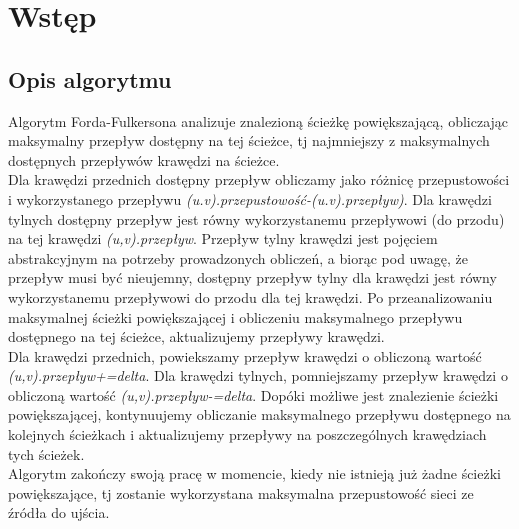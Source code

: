 \documentclass[10pt]{minutes}
\begin{document}
\MakeMinutesMeta


\section{Wstęp} %
  \subsection{Opis algorytmu}
    Algorytm Forda-Fulkersona analizuje znalezioną ścieżkę powiększającą, obliczając maksymalny przepływ dostępny na tej ścieżce, tj najmniejszy z maksymalnych dostępnych przepływów krawędzi na ścieżce.\\
    Dla krawędzi przednich dostępny przepływ obliczamy jako różnicę przepustowości i wykorzystanego przepływu \emph{(u.v).przepustowość-(u.v).przepływ)}. Dla krawędzi tylnych dostępny przepływ jest równy wykorzystanemu przepływowi (do przodu) na tej 
    krawędzi \emph{(u,v).przepływ}. Przepływ tylny krawędzi jest pojęciem abstrakcyjnym na potrzeby prowadzonych obliczeń, a biorąc pod uwagę, że przepływ musi być nieujemny, dostępny przepływ tylny dla krawędzi jest równy wykorzystanemu przepływowi do przodu 
    dla tej krawędzi.
    Po przeanalizowaniu maksymalnej ścieżki powiększającej i obliczeniu maksymalnego przepływu dostępnego na tej ścieżce, aktualizujemy przepływy krawędzi.\\
    Dla krawędzi przednich, powiekszamy przepływ krawędzi o obliczoną wartość \emph{(u,v).przepływ+=delta}. Dla krawędzi tylnych, pomniejszamy przepływ krawędzi o obliczoną wartość \emph{(u,v).przepływ-=delta}.
    Dopóki możliwe jest znalezienie ścieżki powiększającej, kontynuujemy obliczanie maksymalnego przepływu dostępnego na kolejnych ścieżkach i aktualizujemy przepływy na poszczególnych krawędziach tych ścieżek.\\
    Algorytm zakończy swoją pracę w momencie, kiedy nie istnieją już żadne ścieżki powiększające, tj zostanie wykorzystana maksymalna przepustowość sieci ze źródła do ujścia.
\end{document}
